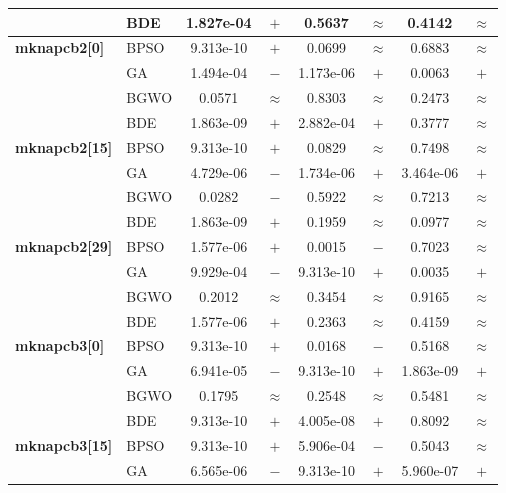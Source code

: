 \begin{table}[htbp]
\begin{tabular*}{\textwidth}{@{\extracolsep{\fill}}llcccccc@{}}
                       & BDE   & 1.827e-04 & $+$ &    0.5637 & $\approx$ &    0.4142 & $\approx$ \\
    \midrule
    \textbf{mknapcb2[0]} & BPSO  & 9.313e-10 & $+$ &    0.0699 & $\approx$ &    0.6883 & $\approx$ \\
                       & GA    & 1.494e-04 & $-$ & 1.173e-06 & $+$ &    0.0063 & $+$ \\
                       & BGWO  &    0.0571 & $\approx$ &    0.8303 & $\approx$ &    0.2473 & $\approx$ \\
                       & BDE   & 1.863e-09 & $+$ & 2.882e-04 & $+$ &    0.3777 & $\approx$ \\
    \midrule
    \textbf{mknapcb2[15]} & BPSO  & 9.313e-10 & $+$ &    0.0829 & $\approx$ &    0.7498 & $\approx$ \\
                       & GA    & 4.729e-06 & $-$ & 1.734e-06 & $+$ & 3.464e-06 & $+$ \\
                       & BGWO  &    0.0282 & $-$ &    0.5922 & $\approx$ &    0.7213 & $\approx$ \\
                       & BDE   & 1.863e-09 & $+$ &    0.1959 & $\approx$ &    0.0977 & $\approx$ \\
    \midrule
    \textbf{mknapcb2[29]} & BPSO  & 1.577e-06 & $+$ &    0.0015 & $-$ &    0.7023 & $\approx$ \\
                       & GA    & 9.929e-04 & $-$ & 9.313e-10 & $+$ &    0.0035 & $+$ \\
                       & BGWO  &    0.2012 & $\approx$ &    0.3454 & $\approx$ &    0.9165 & $\approx$ \\
                       & BDE   & 1.577e-06 & $+$ &    0.2363 & $\approx$ &    0.4159 & $\approx$ \\
    \midrule
    \textbf{mknapcb3[0]} & BPSO  & 9.313e-10 & $+$ &    0.0168 & $-$ &    0.5168 & $\approx$ \\
                       & GA    & 6.941e-05 & $-$ & 9.313e-10 & $+$ & 1.863e-09 & $+$ \\
                       & BGWO  &    0.1795 & $\approx$ &    0.2548 & $\approx$ &    0.5481 & $\approx$ \\
                       & BDE   & 9.313e-10 & $+$ & 4.005e-08 & $+$ &    0.8092 & $\approx$ \\
    \midrule
    \textbf{mknapcb3[15]} & BPSO  & 9.313e-10 & $+$ & 5.906e-04 & $-$ &    0.5043 & $\approx$ \\
                       & GA    & 6.565e-06 & $-$ & 9.313e-10 & $+$ & 5.960e-07 & $+$ \\

\end{tabular*}
\end{table}
